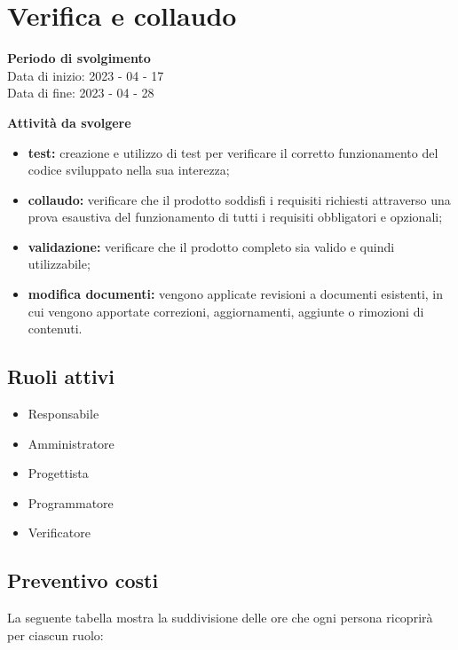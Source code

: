 \section{Verifica e collaudo}

\textbf{Periodo di svolgimento}
\\ Data di inizio: 2023 - 04 - 17 \\ Data di fine: 2023 - 04 - 28

\textbf{Attività da svolgere}
    \begin{itemize}
        \item \textbf{test:} creazione e utilizzo di test per verificare il corretto funzionamento del codice sviluppato nella sua interezza; 
        \item \textbf{collaudo:} verificare che il prodotto soddisfi i requisiti richiesti attraverso una prova esaustiva del funzionamento di tutti i requisiti obbligatori e opzionali;
        \item \textbf{validazione:} verificare che il prodotto completo sia valido e quindi utilizzabile;
        \item \textbf{modifica documenti:} vengono applicate revisioni a documenti esistenti, in cui vengono apportate correzioni, aggiornamenti, aggiunte o rimozioni di contenuti.
    \end{itemize}

\subsection{Ruoli attivi}
\begin{itemize}
    \item Responsabile 
    \item Amministratore 
    \item Progettista 
    \item Programmatore 
    \item Verificatore 
\end{itemize}

\subsection{Preventivo costi}

La seguente tabella mostra la suddivisione delle ore che ogni persona ricoprirà per ciascun ruolo:

